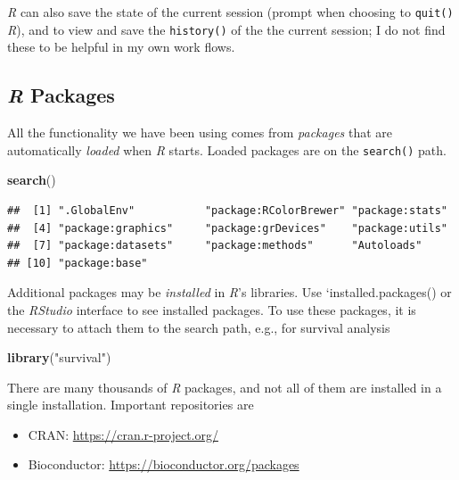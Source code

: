 \documentclass[]{article}
\newenvironment{Shaded}{\begin{snugshade}}{\end{snugshade}}
\newcommand{\KeywordTok}[1]{\textcolor[rgb]{0.13,0.29,0.53}{\textbf{#1}}}
\newcommand{\StringTok}[1]{\textcolor[rgb]{0.31,0.60,0.02}{#1}}
\newcommand{\NormalTok}[1]{#1}
\providecommand{\tightlist}{%
  \setlength{\itemsep}{0pt}\setlength{\parskip}{0pt}}
\theoremstyle{definition}
\theoremstyle{definition}
\theoremstyle{remark}
\begin{document}
\emph{R} can also save the state of the current session (prompt when
choosing to \texttt{quit()} \emph{R}), and to view and save the
\texttt{history()} of the the current session; I do not find these to be
helpful in my own work flows.

\subsection{\texorpdfstring{\emph{R}
Packages}{R Packages}}\label{r-packages}

All the functionality we have been using comes from \emph{packages} that
are automatically \emph{loaded} when \emph{R} starts. Loaded packages
are on the \texttt{search()} path.

\begin{Shaded}
\begin{Highlighting}[]
\KeywordTok{search}\NormalTok{()}
\end{Highlighting}
\end{Shaded}

\begin{verbatim}
##  [1] ".GlobalEnv"           "package:RColorBrewer" "package:stats"       
##  [4] "package:graphics"     "package:grDevices"    "package:utils"       
##  [7] "package:datasets"     "package:methods"      "Autoloads"           
## [10] "package:base"
\end{verbatim}

Additional packages may be \emph{installed} in \emph{R}'s libraries. Use
`installed.packages() or the \emph{RStudio} interface to see installed
packages. To use these packages, it is necessary to attach them to the
search path, e.g., for survival analysis

\begin{Shaded}
\begin{Highlighting}[]
\KeywordTok{library}\NormalTok{(}\StringTok{"survival"}\NormalTok{)}
\end{Highlighting}
\end{Shaded}

There are many thousands of \emph{R} packages, and not all of them are
installed in a single installation. Important repositories are

\begin{itemize}
\tightlist
\item
  CRAN: \url{https://cran.r-project.org/}
\item
  Bioconductor: \url{https://bioconductor.org/packages}
\end{itemize}
\end{document}
